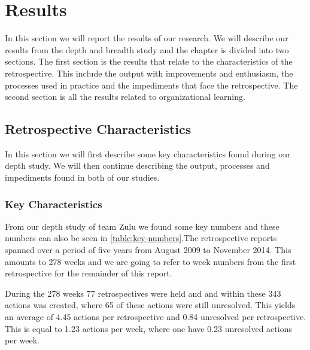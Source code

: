 \chapter{Results}
In this section we will report the results of our research. We will describe our results from the depth and breadth study and the chapter is divided into two sections. The first section is the results that relate to the characteristics of the retrospective. This include the output with improvements and enthusiasm, the processes used in practice and the impediments that face the retrospective. The second section is all the results related to organizational learning.

\section{Retrospective Characteristics}
In this section we will first describe some key characteristics found during our depth study. We will then continue describing the output, processes and impediments found in both of our studies. 

\subsection{Key Characteristics}
From our depth study of team Zulu we found some key numbers and these numbers can also be seen in \autoref{table:key-numbers}.The retrospective reports spanned over a period of five years from August 2009 to November 2014. This amounts to 278 weeks and we are going to refer to week numbers from the first retrospective for the remainder of this report. 
\begin{table}[!h]
	\begin{center}
	\caption{Some key numbers from the retrospectives}
	\label{table:key-numbers}
\end{center}
\end{table}
During the 278 weeks 77 retrospectives were held and and within these 343 actions was created, where 65 of these actions were still unresolved. This yields an average of 4.45 actions per retrospective and 0.84 unresolved per retrospective. This is equal to 1.23 actions per week, where one have 0.23 unresolved actions per week. 

